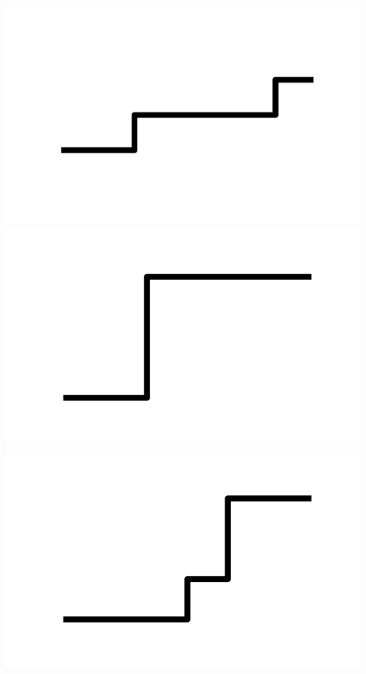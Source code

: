 \documentclass[]{report}
\begin{document}
\includegraphics[scale=.1]{pictures/21/state_cluster_shapes_364.pdf} 
\includegraphics[scale=.1]{pictures/21/state_cluster_shapes_365.pdf} 
\includegraphics[scale=.1]{pictures/21/state_cluster_shapes_366.pdf} 
\end{document}
